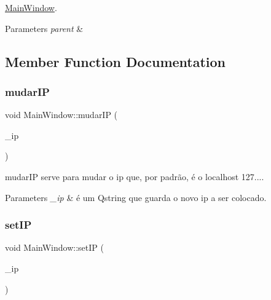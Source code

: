 \mbox{\hyperlink{class_main_window}{Main\+Window}}. 


\begin{DoxyParams}{Parameters}
{\em parent} & \\
\hline
\end{DoxyParams}


\subsection{Member Function Documentation}
\mbox{\label{class_main_window_aa428a7979ad9beb9c6ebf6478eb611b8}} 
\subsubsection{\texorpdfstring{mudar\+IP}{mudarIP}}
{\footnotesize\ttfamily void Main\+Window\+::mudar\+IP (\begin{DoxyParamCaption}\item[{Q\+String}]{\+\_\+ip }\end{DoxyParamCaption})\hspace{0.3cm}{\ttfamily [slot]}}



mudar\+IP serve para mudar o ip que, por padrão, é o localhost 127.... 


\begin{DoxyParams}{Parameters}
{\em \+\_\+ip} & é um Qstring que guarda o novo ip a ser colocado. \\
\hline
\end{DoxyParams}
\mbox{\label{class_main_window_a30621e00be29d21bb6e1a7c6f20afc8d}} 
\subsubsection{\texorpdfstring{set\+IP}{setIP}}
{\footnotesize\ttfamily void Main\+Window\+::set\+IP (\begin{DoxyParamCaption}\item[{Q\+String}]{\+\_\+ip }\end{DoxyParamCaption})\hspace{0.3cm}{\ttfamily [slot]}}



